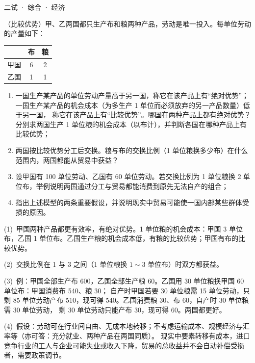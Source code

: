 \documentclass[cjk=noto, seal=first]{mojing-exam}
\begin{document}
\begin{paper}[time={建议 1.5 小时（训练设置）}, full=100]{二试 · 综合 · 经济}
\begin{questions}
\question[25]
（比较优势）甲、乙两国都只生产布和粮两种产品，劳动是唯一投入。每单位劳动的产量如下：
\begin{center}
\begin{tabular}{c|cc}
  \toprule
  & 布 & 粮 \\
  \midrule
  甲国 & 6 & 2 \\
  乙国 & 1 & 1 \\
  \bottomrule
\end{tabular}
\end{center}
\begin{enumerate}
  \item 一国生产某产品的单位劳动产量高于另一国，称它在该产品上有“绝对优势”；一国生产某产品的机会成本（为多生产 1 单位而必须放弃的另一产品数量）低于另一国，
        称它在该产品上有“比较优势”。哪国在两种产品上都有绝对优势？分别求两国生产 1 单位粮的机会成本（以布计），并判断各国在哪种产品上有比较优势；
  \item 两国按比较优势分工后交换。粮与布的交换比例（1 单位粮换多少布）在什么范围内，两国都能从贸易中获益？
  \item 设甲国有 100 单位劳动、乙国有 60 单位劳动。若交换比例为 1 单位粮换 2 单位布，举例说明两国通过分工与贸易都能消费到原先无法自产的组合；
  \item 指出上述模型的两条重要假设，并说明现实中贸易可能使一国内部某些群体受损的原因。
\end{enumerate}
\answerspace{2cm}
\begin{solution}
(1)~甲国两种产品都更有效率，有绝对优势。1 单位粮的机会成本：甲国 3 单位布，乙国 1 单位布。乙国生产粮的机会成本低，有粮的比较优势；甲国有布的比较优势。

(2)~交换比例在 1 与 3 之间（1 单位粮换 $1\sim3$ 单位布）时双方都获益。

(3)~例：甲国全部生产布 600，乙国全部生产粮 60。乙国用 30 单位粮换甲国 60 单位布：甲国消费布 540、粮 30；
自产时甲国若要 30 单位粮需 15 单位劳动，只剩 85 单位劳动产布 510，现可得 540。乙国消费粮 30、布 60，自产时 30 单位粮需 30 单位劳动，
剩 30 单位劳动只能产布 30，现可得 60。两国都更好。

(4)~假设：劳动可在行业间自由、无成本地转移；不考虑运输成本、规模经济与汇率等（亦可答：充分就业、两种产品在两国同质）。
现实中要素转移有成本，进口竞争行业的工人与企业可能失业或收入下降，贸易的总收益并不会自动补偿受损者，需要政策调节。
\end{solution}

\end{questions}
\end{paper}
\end{document}
